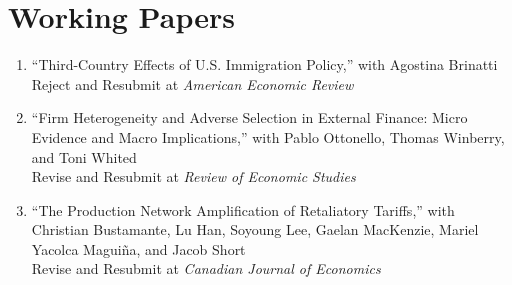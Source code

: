 \documentclass[11pt]{article}
\begin{document}
\section{Working Papers}
\begin{enumerate}[leftmargin=*,labelindent=0em,labelsep=0em,itemindent=-10pt, resume]
	
	\item ``Third-Country Effects of U.S. Immigration Policy,'' with Agostina Brinatti\\[0.5em] 
	Reject and Resubmit at \textit{American Economic Review}
	\item ``Firm Heterogeneity and Adverse Selection in External Finance: Micro Evidence and Macro Implications,'' with Pablo Ottonello, Thomas Winberry, and Toni Whited\\[0.5em]
	Revise and Resubmit at \textit{Review of Economic Studies} 
	\item ``The Production Network Amplification of Retaliatory Tariffs,'' with Christian Bustamante, Lu Han, Soyoung Lee, Gaelan MacKenzie, Mariel Yacolca Maguiña, and Jacob Short\\[0.5em]
	Revise and Resubmit at \textit{Canadian Journal of Economics}
\end{enumerate}

\end{document}
